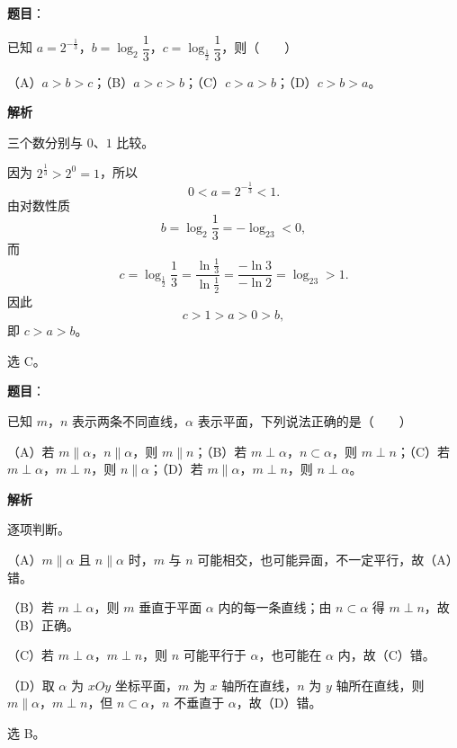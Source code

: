 \begin{answer}

\textbf{题目}：

已知 $a=2^{-\frac13}$，$b=\log_2\dfrac13$，$c=\log_{\frac12}\dfrac13$，则\mbox{（　　）}

（A）$a>b>c$；（B）$a>c>b$；（C）$c>a>b$；（D）$c>b>a$。

\textbf{解析}

三个数分别与 $0$、$1$ 比较。

因为 $2^{\frac13}>2^0=1$，所以
\nopagebreak[4]
\[0<a=2^{-\frac13}<1.\]
由对数性质
\nopagebreak[4]
\[b=\log_2\frac13=-\log_23<0,\]
而
\nopagebreak[4]
\[c=\log_{\frac12}\frac13=\frac{\ln\frac13}{\ln\frac12}=\frac{-\ln3}{-\ln2}=\log_23>1.\]
因此
\nopagebreak[4]
\[c>1>a>0>b,\]
即 $c>a>b$。

选 C。


\end{answer}
\begin{answer}

\textbf{题目}：

已知 $m$，$n$ 表示两条不同直线，$\alpha$ 表示平面，下列说法正确的是\mbox{（　　）}

（A）若 $m\parallel\alpha$，$n\parallel\alpha$，则 $m\parallel n$；（B）若 $m\perp\alpha$，$n\subset\alpha$，则 $m\perp n$；（C）若 $m\perp\alpha$，$m\perp n$，则 $n\parallel\alpha$；（D）若 $m\parallel\alpha$，$m\perp n$，则 $n\perp\alpha$。

\textbf{解析}

逐项判断。

（A）$m\parallel\alpha$ 且 $n\parallel\alpha$ 时，$m$ 与 $n$ 可能相交，也可能异面，不一定平行，故（A）错。

（B）若 $m\perp\alpha$，则 $m$ 垂直于平面 $\alpha$ 内的每一条直线；由 $n\subset\alpha$ 得 $m\perp n$，故（B）正确。

（C）若 $m\perp\alpha$，$m\perp n$，则 $n$ 可能平行于 $\alpha$，也可能在 $\alpha$ 内，故（C）错。

（D）取 $\alpha$ 为 $xOy$ 坐标平面，$m$ 为 $x$ 轴所在直线，$n$ 为 $y$ 轴所在直线，则 $m\parallel\alpha$，$m\perp n$，但 $n\subset\alpha$，$n$ 不垂直于 $\alpha$，故（D）错。

选 B。


\end{answer}
